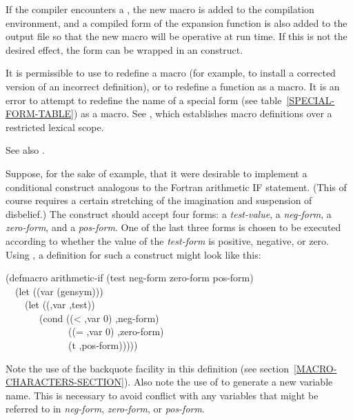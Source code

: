 \begin{defmac}
If the compiler encounters a ,
the new macro is added to the compilation
environment, and a compiled form of the expansion function is also added
to the output file so that the new macro will be operative at run time.
If this is not the desired effect, the  form can be wrapped
in an  construct.

It is permissible to use  to redefine a macro
(for example, to install
a corrected version of an incorrect definition), or to redefine
a function as a macro.
It is an error to attempt to redefine the name of a special
form (see table~\ref{SPECIAL-FORM-TABLE}) as a macro.
See , which establishes macro
definitions over a restricted lexical scope.

\begin{newer}
See also .
\end{newer}

Suppose, for the sake of example, that it were desirable
to implement a conditional construct analogous to the
Fortran arithmetic IF statement.  (This of course requires a certain
stretching of the imagination and suspension of disbelief.)
The construct should accept four forms: a \emph{test-value},
a \emph{neg-form}, a \emph{zero-form}, and a \emph{pos-form}.
One of the last three forms is chosen to be executed according
to whether the value of the \emph{test-form} is positive, negative,
or zero.
Using , a definition for such a construct
might look like this:
\begin{lisp}
(defmacro arithmetic-if (test neg-form zero-form pos-form) \\
~~(let ((var (gensym))) \\
~~~~{\Xbq}(let ((,var ,test)) \\
~~~~~~~(cond ((< ,var 0) ,neg-form) \\
~~~~~~~~~~~~~((= ,var 0) ,zero-form) \\
~~~~~~~~~~~~~(t ,pos-form)))))
\end{lisp}
Note the use of the backquote facility in this definition
(see section~\ref{MACRO-CHARACTERS-SECTION}).
Also note the use of  to generate a new variable name.
This is necessary to avoid conflict with any variables that might
be referred to in \emph{neg-form}, \emph{zero-form}, or \emph{pos-form}.


\end{defmac}
